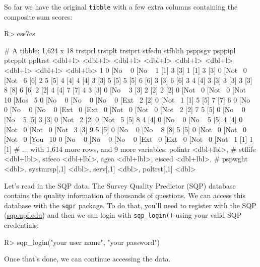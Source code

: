 \documentclass[
]{jss}
\begin{document}
So far we have the original \texttt{tibble} with a few extra columns
containing the composite sum scores:

\begin{CodeChunk}

\begin{CodeInput}
R> ess7es
\end{CodeInput}

\begin{CodeOutput}
# A tibble: 1,624 x 18
   trstprl trstplt trstprt  stfedu stfhlth psppsgv psppipl ptcpplt  ppltrst
   <dbl+l> <dbl+l> <dbl+l> <dbl+l> <dbl+l> <dbl+l> <dbl+l> <dbl+l> <dbl+lb>
 1 0 [No ~ 0 [No ~ 1 [1]   3 [3]   1 [1]   3 [3]   0 [Not~ 0 [Not~  6 [6]  
 2 5 [5]   4 [4]   4 [4]   3 [3]   5 [5]   5 [5]   6 [6]   3 [3]    6 [6]  
 3 4 [4]   3 [3]   3 [3]   3 [3]   8 [8]   6 [6]   2 [2]   4 [4]    7 [7]  
 4 3 [3]   0 [No ~ 3 [3]   2 [2]   2 [2]   0 [Not~ 0 [Not~ 0 [Not~ 10 [Mos~
 5 0 [No ~ 0 [No ~ 0 [No ~ 0 [Ext~ 2 [2]   0 [Not~ 1 [1]   5 [5]    7 [7]  
 6 0 [No ~ 0 [No ~ 0 [No ~ 0 [Ext~ 0 [Ext~ 0 [Not~ 0 [Not~ 0 [Not~  2 [2]  
 7 5 [5]   0 [No ~ 0 [No ~ 5 [5]   3 [3]   0 [Not~ 2 [2]   0 [Not~  5 [5]  
 8 4 [4]   0 [No ~ 0 [No ~ 5 [5]   4 [4]   0 [Not~ 0 [Not~ 0 [Not~  3 [3]  
 9 5 [5]   0 [No ~ 0 [No ~ 8 [8]   5 [5]   0 [Not~ 0 [Not~ 0 [Not~  0 [You~
10 0 [No ~ 0 [No ~ 0 [No ~ 0 [Ext~ 0 [Ext~ 0 [Not~ 0 [Not~ 1 [1]    1 [1]  
# ... with 1,614 more rows, and 9 more variables: polintr <dbl+lbl>,
#   stflife <dbl+lbl>, stfeco <dbl+lbl>, agea <dbl+lbl>, eisced <dbl+lbl>,
#   pspwght <dbl>, systmrsp[,1] <dbl>, serv[,1] <dbl>, poltrst[,1] <dbl>
\end{CodeOutput}
\end{CodeChunk}

Let's read in the SQP data. The Survey Quality Predictor (SQP) database
contains the quality information of thousands of questions. We can
access this database with the \texttt{sqpr} package. To do that, you'll
need to register with the SQP (\href{www.sqp.upf.edu}{sqp.upf.edu}) and
then we can login with \texttt{sqp\_login()} using your valid SQP
credentials:

\begin{CodeChunk}

\begin{CodeInput}
R> sqp_login("your user name", "your password")
\end{CodeInput}
\end{CodeChunk}

Once that's done, we can continue accessing the data.
\end{document}
